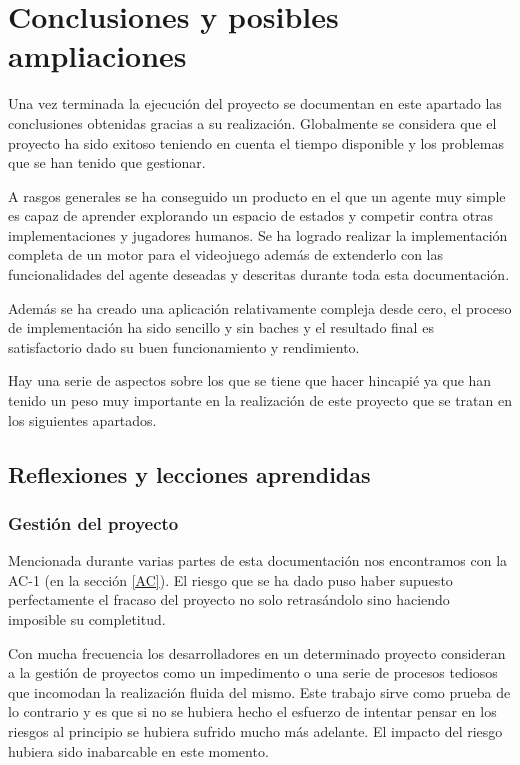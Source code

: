 \chapter{Conclusiones y posibles ampliaciones}

\label{cap:conclusiones}

Una vez terminada la ejecución del proyecto se documentan en este apartado las conclusiones obtenidas gracias a su realización. Globalmente se considera que el proyecto ha sido exitoso teniendo en cuenta el tiempo disponible y los problemas que se han tenido que gestionar.

\bigskip


A rasgos generales se ha conseguido un producto en el que un agente muy simple es capaz de aprender explorando un espacio de estados y competir contra otras implementaciones y jugadores humanos. Se ha logrado realizar la implementación completa de un motor para el videojuego además de extenderlo con las funcionalidades del agente deseadas y descritas durante toda esta documentación.

\bigskip

Además se ha creado una aplicación relativamente compleja desde cero, el proceso de implementación ha sido sencillo y sin baches y el resultado final es satisfactorio dado su buen funcionamiento y rendimiento.

\bigskip

Hay una serie de aspectos sobre los que se tiene que hacer hincapié ya que han tenido un peso muy importante en la realización de este proyecto que se tratan en los siguientes apartados.

\section{Reflexiones y lecciones aprendidas}

\subsection{Gestión del proyecto}

Mencionada durante varias partes de esta documentación nos encontramos con la AC-1 (en la sección \ref{AC}). El riesgo que se ha dado puso haber supuesto perfectamente el fracaso del proyecto no solo retrasándolo sino haciendo imposible su completitud.

\bigskip

Con mucha frecuencia los desarrolladores en un determinado proyecto consideran a la gestión de proyectos como un impedimento o una serie de procesos tediosos que incomodan la realización fluida del mismo. Este trabajo sirve como prueba de lo contrario y es que si no se hubiera hecho el esfuerzo de intentar pensar en los riesgos al principio se hubiera sufrido mucho más adelante. El impacto del riesgo hubiera sido inabarcable en este momento.

